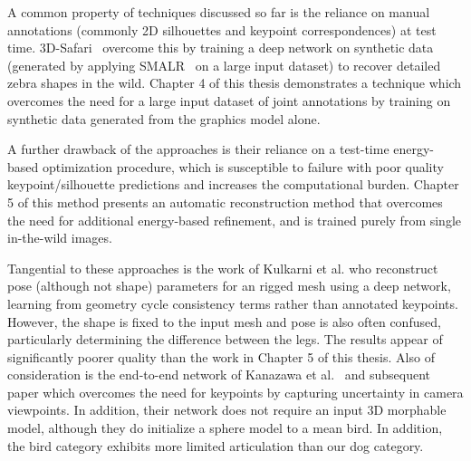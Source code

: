    A common property of techniques discussed so far is the reliance on manual annotations (commonly 2D silhouettes and keypoint correspondences) at test time. 3D-Safari~\cite{Zuffi19Safari} overcome this by training a deep network on synthetic data (generated by applying SMALR~\cite{zuffi_lions} on a large input dataset) to recover detailed zebra shapes in the wild. Chapter 4 of this thesis demonstrates a technique which overcomes the need for a large input dataset of joint annotations by training on synthetic data generated from the graphics model alone. 
    
    A further drawback of the approaches is their reliance on a test-time energy-based optimization procedure, which is susceptible to failure with poor quality keypoint/silhouette predictions and increases the computational burden. Chapter 5 of this method presents an automatic reconstruction method that overcomes the need for additional energy-based refinement, and is trained purely from single in-the-wild images. 
    
    Tangential to these approaches is the work of Kulkarni et al. who reconstruct pose (although not shape) parameters for an rigged mesh using a deep network, learning from geometry cycle consistency terms rather than annotated keypoints. However, the shape is fixed to the input mesh and pose is also often confused, particularly determining the difference between the legs. The results appear of significantly poorer quality than the work in Chapter 5 of this thesis. Also of consideration is the end-to-end network of Kanazawa et al.~\cite{kanazawa2018birds} and subsequent paper which overcomes the need for keypoints by capturing uncertainty in camera viewpoints. In addition, their network does not require an input 3D morphable model, although they do initialize a sphere model to a mean bird. In addition, the bird category exhibits more limited articulation than our dog category. 
    
    







